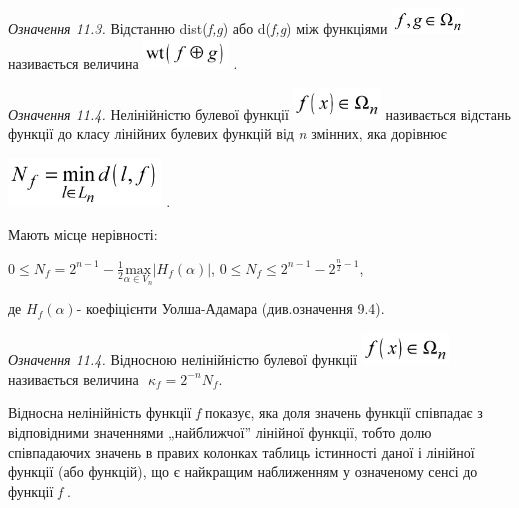  \textit{Означення 11.3.}\textit{ }Відстанню
dist(\textit{f}\textit{,}\textit{g}) або d(\textit{f}\textit{,}\textit{g})  між
функціями 
\includegraphics[width=0.7563in,height=0.2701in]{crypt-img/crypt-img262.png} 
називається  величина 
\includegraphics[width=0.8917in,height=0.3173in]{crypt-img/crypt-img263.png} .

 \textit{Означення 11.4.}\textit{  }Нелінійністю булевої функції 
\includegraphics[width=0.9098in,height=0.3354in]{crypt-img/crypt-img264.png} 
називається відстань функції до класу лінійних булевих функцій від
\textit{n}\textit{ }змінних, яка дорівнює

{\centering
 \includegraphics[width=1.6008in,height=0.5071in]{crypt-img/crypt-img265.png} .
\par}

Мають місце нерівності:  

 ${0\le N_{{f}}=2^{{n-1}}-\frac{1}{2}\underset{{\alpha \in
V_{{n}}}}{{\text{max}}}|H_{f}{(\alpha )}|}$,   ${0\le N_{{f}}\le
2^{{n-1}}-2^{{\frac{n}{2}-1}}}$,

де  ${H_{{f}}(\alpha )}${}-  коефіцієнти Уолша-Адамара (див.означення 9.4).

 \textit{Означення 11.4.}\textit{ }Відносною нелінійністю булевої функції 
\includegraphics[width=0.9098in,height=0.3354in]{crypt-img/crypt-img266.png} 
називається величина   $ $ ${\kappa _{{f}}=2^{{-n}}N_{{f}}}$.

Відносна нелінійність функції \textit{f}  показує, яка доля значень функції
співпадає з відповідними значеннями „найближчої” лінійної функції, тобто долю
співпадаючих  значень в правих колонках таблиць істинності даної і лінійної
функції (або функцій), що є найкращим наближенням у означеному сенсі до функції
\textit{f} .

